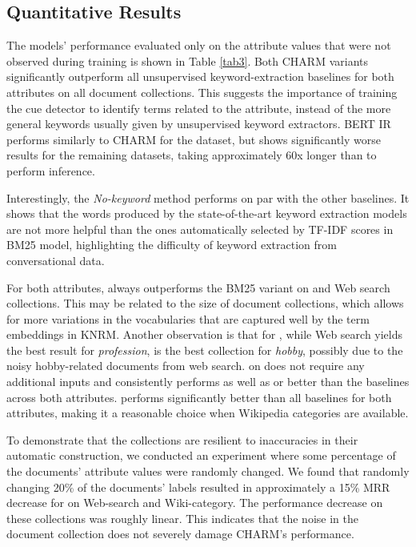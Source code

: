 \setlength\dashlinedash{0.2pt}
\setlength\dashlinegap{1.5pt}
\setlength\arrayrulewidth{0.3pt}




\subsection{Quantitative Results}
\label{charm_results}

The models' performance evaluated only on the attribute values that were not observed during training is shown in Table \ref{tab3}. Both CHARM variants significantly outperform all unsupervised keyword-extraction baselines for both attributes on all document collections. This suggests the importance of training the cue detector to identify terms related to the attribute, instead of the more general keywords usually given by unsupervised keyword extractors.
BERT IR performs similarly to CHARM for the  dataset, but shows significantly worse results for the remaining datasets, taking approximately 60x longer than  to perform inference.

Interestingly, the \emph{No-keyword} method performs on par with the other baselines. It shows that the words produced by the state-of-the-art keyword extraction models are not more helpful than the ones automatically selected by TF-IDF scores in BM25 model, highlighting the difficulty of keyword extraction from conversational data.

For both attributes,  always outperforms the BM25 variant on  and Web search collections. This may be related to the size of document collections, which allows for more variations in the vocabularies that are captured well by the term embeddings in KNRM. Another observation is that for , while Web search yields the best result for \emph{profession},  is the best collection for \emph{hobby}, possibly due to the noisy hobby-related documents from web search.
 on  does not require any additional inputs and consistently performs as well as or better than the baselines across both attributes. 
 performs significantly better than all baselines for both attributes, making it a reasonable choice when Wikipedia categories are available.

To demonstrate that the collections are resilient to inaccuracies in their automatic construction, we conducted an experiment where some percentage of the documents' attribute values were randomly changed. We found that randomly changing 20\% of the documents' labels resulted in approximately a 15\% MRR decrease for  on Web-search and Wiki-category.
The performance decrease on these collections was roughly linear.
This indicates that the noise in the document collection does not severely damage CHARM's performance.

